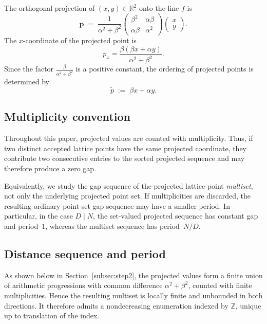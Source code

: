 \documentclass[11pt]{article}
\theoremstyle{plain}
\theoremstyle{definition}
\theoremstyle{remark}
\begin{document}
The orthogonal projection of \((x, y) \in \mathbb{R}^2\) onto the line \(f\)
is
\begin{equation}\label{eq:projection}
    \mathbf{p} \;=\;
    \frac{1}{\alpha^2 + \beta^2}
    \begin{pmatrix}
        \beta^2 & \alpha\beta \\
        \alpha\beta & \alpha^2
    \end{pmatrix}
    \begin{pmatrix} x \\ y \end{pmatrix}.
\end{equation}
The \(x\)-coordinate of the projected point is
\[
    p_x = \frac{\beta(\beta x + \alpha y)}{\alpha^2 + \beta^2}.
\]
Since the factor \(\frac{\beta}{\alpha^2+\beta^2}\) is a positive constant,
the ordering of projected points is determined by
\begin{equation}\label{eq:ptilde}
    \tilde{p} \;:=\; \beta x + \alpha y.
\end{equation}

\subsection{Multiplicity convention}\label{subsec:multiplicity}

Throughout this paper, projected values are counted with multiplicity.
Thus, if two distinct accepted lattice points have the same projected
coordinate, they contribute two consecutive entries to the sorted projected
sequence and may therefore produce a zero gap.

Equivalently, we study the gap sequence of the projected lattice-point
\emph{multiset}, not only the underlying projected point set.  If
multiplicities are discarded, the resulting ordinary point-set gap sequence
may have a smaller period.  In particular, in the case \(D \mid N\), the
set-valued projected sequence has constant gap and period~\(1\), whereas
the multiset sequence has period~\(N/D\).

\subsection{Distance sequence and period}\label{subsec:distance}

As shown below in Section~\ref{subsec:step2}, the projected values form a
finite union of arithmetic progressions with common difference
\(\alpha^2+\beta^2\), counted with finite multiplicities.  Hence the
resulting multiset is locally finite and unbounded in both directions.  It
therefore admits a nondecreasing enumeration indexed by \(\mathbb{Z}\),
unique up to translation of the index.
\end{document}
